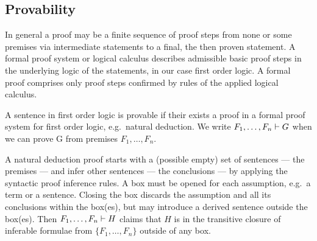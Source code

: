 
\subsection{Provability}

In general a proof may be a finite sequence of proof steps
from none or some premises via intermediate statements
to a final, the then proven statement.
A formal proof system or logical calculus describes admissible basic proof steps
in the underlying logic of the statements, in our case first order logic.
A formal proof comprises only proof steps confirmed by rules of the applied logical calculus.



\begin{definition}A sentence in first order logic is provable
	if their exists a proof in a formal proof system for first order logic,
	e.g.~natural deduction.
	We write
	\( F_1, \ldots, F_n \vdash G \)
	when we can prove G from premises \( F_1,\ldots,F_n \).
\end{definition}

A natural deduction proof starts with a (possible empty) set of sentences --- the premises ---
and infer other sentences --- the conclusions --- by applying the syntactic proof inference rules.
A box must be opened for each assumption, e.g.~a term or a sentence.
Closing the box discards the assumption and all its conclusions within the box(es),
but may introduce a derived sentence outside the box(es).
Then \( F_1,\ldots,F_n \vdash H \) claims that \( H \)
is in the transitive closure of inferable formulae from \( \{ F_1,\ldots,F_n\} \) outside of any box.

